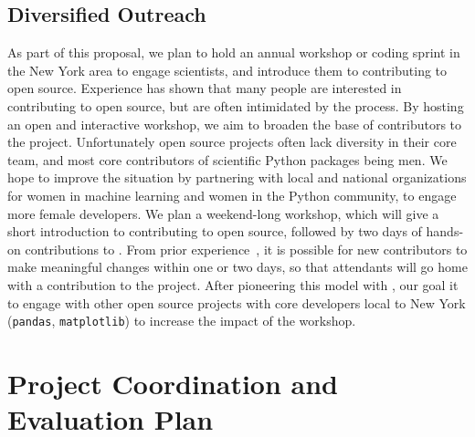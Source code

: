 \subsection{Diversified Outreach}
As part of this proposal, we plan to hold an annual workshop or coding sprint
in the New York area to engage scientists, and introduce them to contributing
to open source. Experience has shown that many people are interested
in contributing to open source, but are often intimidated by the process.
By hosting an open and interactive workshop, we aim to broaden the base
of contributors to the \sklearn{} project.
Unfortunately open source projects often lack diversity in their core team,
and most core contributors of scientific Python packages being men.
We hope to improve the situation by partnering with local and national
organizations for women in machine learning and women in the Python community,
to engage more female developers.
We plan a weekend-long workshop, which will give a short introduction to
contributing to open source, followed by two days of hands-on contributions to
\sklearn{}.
From prior experience~\autocite{meetupsprintSF}, it is possible for new
contributors to make meaningful changes within one or two days, so that
attendants will go home with a contribution to the project. After pioneering
this model with \sklearn{}, our goal it to engage with other open source
projects with core developers local to New York (\texttt{pandas},
\texttt{matplotlib}) to increase the impact of the workshop.

\section{Project Coordination and Evaluation Plan}
